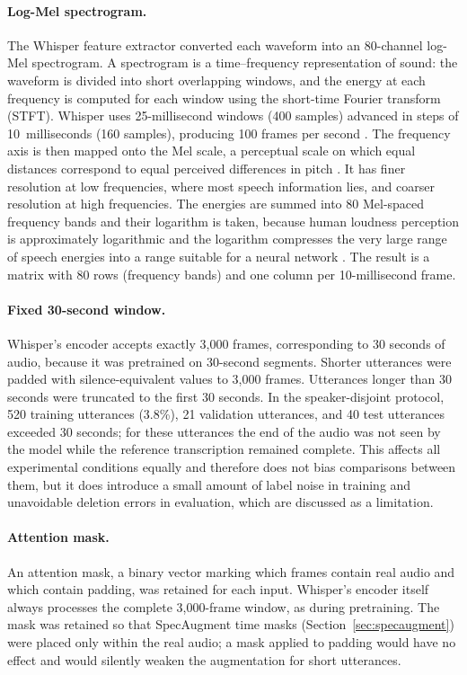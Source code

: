 \paragraph{Log-Mel spectrogram.}
The Whisper feature extractor converted each waveform into an 80-channel
log-Mel spectrogram. A spectrogram is a time--frequency representation of sound:
the waveform is divided into short overlapping windows, and the energy at each
frequency is computed for each window using the short-time Fourier transform
(STFT). Whisper uses 25-millisecond windows (400 samples) advanced in steps of
10~milliseconds (160 samples), producing 100 frames per second
\citep{Radford2022}. The frequency axis is then mapped onto the Mel scale, a
perceptual scale on which equal distances correspond to equal perceived
differences in pitch \citep{Stevens1937}. It has finer resolution at low
frequencies, where most speech information lies, and coarser resolution at high
frequencies. The energies are summed into 80 Mel-spaced frequency bands and their
logarithm is taken, because human loudness perception is approximately
logarithmic and the logarithm compresses the very large range of speech energies
into a range suitable for a neural network \citep{Davis1980}. The result is a
matrix with 80 rows (frequency bands) and one column per 10-millisecond frame.

\paragraph{Fixed 30-second window.}
Whisper's encoder accepts exactly 3,000 frames, corresponding to 30 seconds of
audio, because it was pretrained on 30-second segments. Shorter utterances were
padded with silence-equivalent values to 3,000 frames. Utterances longer than 30
seconds were truncated to the first 30 seconds. In the speaker-disjoint protocol,
520 training utterances (3.8\%), 21 validation utterances, and 40 test utterances
exceeded 30 seconds; for these utterances the end of the audio was not seen by the
model while the reference transcription remained complete. This affects all
experimental conditions equally and therefore does not bias comparisons between
them, but it does introduce a small amount of label noise in training and
unavoidable deletion errors in evaluation, which are discussed as a limitation.

\paragraph{Attention mask.}
An attention mask, a binary vector marking which frames contain real audio and
which contain padding, was retained for each input. Whisper's encoder itself
always processes the complete 3,000-frame window, as during pretraining. The mask
was retained so that SpecAugment time masks (Section~\ref{sec:specaugment}) were
placed only within the real audio; a mask applied to padding would have no
effect and would silently weaken the augmentation for short utterances.

